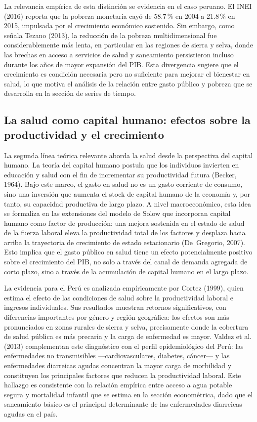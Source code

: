 \documentclass[12pt]{article}
\begin{document}
La relevancia empírica de esta distinción se evidencia en el caso peruano. El INEI (2016) reporta
que la pobreza monetaria cayó de 58.7\,\% en 2004 a 21.8\,\% en 2015, impulsada por el
crecimiento económico sostenido. Sin embargo, como señala Tezano (2013), la reducción de la
pobreza multidimensional fue considerablemente más lenta, en particular en las regiones de sierra y
selva, donde las brechas en acceso a servicios de salud y saneamiento persistieron incluso durante
los años de mayor expansión del PIB. Esta divergencia sugiere que el crecimiento es condición
necesaria pero no suficiente para mejorar el bienestar en salud, lo que motiva el análisis de la
relación entre gasto público y pobreza que se desarrolla en la sección de series de tiempo.

\subsection{La salud como capital humano: efectos sobre la productividad y el crecimiento}

La segunda línea teórica relevante aborda la salud desde la perspectiva del capital humano. La
teoría del capital humano postula que los individuos invierten en educación y salud con el fin de
incrementar su productividad futura (Becker, 1964). Bajo este marco, el gasto en salud no es un
gasto corriente de consumo, sino una inversión que aumenta el stock de capital humano de la
economía y, por tanto, su capacidad productiva de largo plazo. A nivel macroeconómico, esta idea
se formaliza en las extensiones del modelo de Solow que incorporan capital humano como factor de
producción: una mejora sostenida en el estado de salud de la fuerza laboral eleva la productividad
total de los factores y desplaza hacia arriba la trayectoria de crecimiento de estado estacionario
(De~Gregorio, 2007). Esto implica que el gasto público en salud tiene un efecto potencialmente
positivo sobre el crecimiento del PIB, no solo a través del canal de demanda agregada de corto
plazo, sino a través de la acumulación de capital humano en el largo plazo.

La evidencia para el Perú es analizada empíricamente por Cortez (1999), quien estima el efecto de
las condiciones de salud sobre la productividad laboral e ingresos individuales. Sus resultados
muestran retornos significativos, con diferencias importantes por género y región geográfica: los
efectos son más pronunciados en zonas rurales de sierra y selva, precisamente donde la cobertura de
salud pública es más precaria y la carga de enfermedad es mayor. Valdez et al. (2013) complementan
este diagnóstico con el perfil epidemiológico del Perú: las enfermedades no transmisibles
---cardiovasculares, diabetes, cáncer--- y las enfermedades diarreicas agudas concentran la mayor
carga de morbilidad y constituyen los principales factores que reducen la productividad laboral. Este
hallazgo es consistente con la relación empírica entre acceso a agua potable segura y mortalidad
infantil que se estima en la sección econométrica, dado que el saneamiento básico es el principal
determinante de las enfermedades diarreicas agudas en el país.
\end{document}
